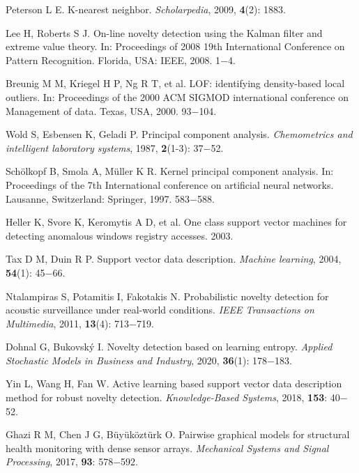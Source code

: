 \documentclass{Style/aas}
\begin{document}
\begin{multicols}{2}
\begin{thebibliography}{99}
     Peterson L E. K-nearest neighbor. {\sl Scholarpedia}, 2009, {\bf 4}(2): 1883.

     Lee H, Roberts S J. On-line novelty detection using the Kalman filter and extreme value theory. In: Proceedings of 2008 19th International Conference on Pattern Recognition. Florida, USA: IEEE, 2008. 1$-$4.
    
     Breunig M M, Kriegel H P, Ng R T, et al. LOF: identifying density-based local outliers. In: Proceedings of the 2000 ACM SIGMOD international conference on Management of data. Texas, USA, 2000. 93$-$104. 

     Wold S, Esbensen K, Geladi P. Principal component analysis.  {\sl Chemometrics and intelligent laboratory systems}, 1987, {\bf 2}(1-3): 37$-$52.

     Schölkopf B, Smola A, Müller K R. Kernel principal component analysis. In: Proceedings of the 7th International conference on artificial neural networks. Lausanne, Switzerland: Springer, 1997. 583$-$588.
 
     Heller K, Svore K, Keromytis A D, et al. One class support vector machines for detecting anomalous windows registry accesses. 2003.

     Tax D M, Duin R P. Support vector data description. {\sl Machine learning}, 2004, {\bf 54}(1): 45$-$66.

     Ntalampiras S, Potamitis I, Fakotakis N. Probabilistic novelty detection for acoustic surveillance under real-world conditions. {\sl IEEE Transactions on Multimedia}, 2011, {\bf 13}(4): 713$-$719.

     Dohnal G, Bukovský I. Novelty detection based on learning entropy. {\sl Applied Stochastic Models in Business and Industry}, 2020, {\bf 36}(1): 178$-$183.




     Yin L, Wang H, Fan W. Active learning based support vector data description method for robust novelty detection.  {\sl Knowledge-Based Systems}, 2018, {\bf 153}: 40$-$52.
   
     Ghazi R M, Chen J G, Büyüköztürk O. Pairwise graphical models for structural health monitoring with dense sensor arrays. {\sl Mechanical Systems and Signal Processing}, 2017,  {\bf 93}: 578$-$592.
    

\end{thebibliography}
\end{multicols}
\end{document}
